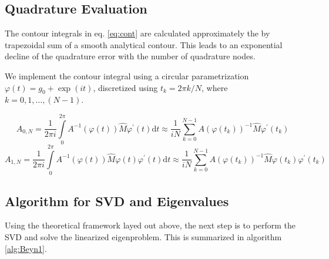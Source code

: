 \documentclass[final,leqno,onefignum,onetabnum]{siamltex1213}
\newcommand{\diff}{\mathrm{d}}
\begin{document}
\subsection{Quadrature Evaluation}
The contour integrals in eq. \ref{eq:cont} are calculated approximately the by trapezoidal sum of a smooth analytical contour. This leads to an exponential decline of the quadrature error with the number of quadrature nodes.

We implement the contour integral using a circular parametrization $\varphi(t) = g_0 + \exp(i t)$, discretized using $t_k = 2\pi k/N$, where $k=0,1,\ldots,(N-1)$. 

\begin{equation}\label{eq:A0int}
A_{0,N} = \frac{1}{2\pi i}\int\limits_{0}^{2\pi} A^{-1}(\varphi(t))\hat{M} \varphi^{\prime}(t)\diff t 
\approx \frac{1}{iN}\sum\limits_{k=0}^{N-1}A(\varphi(t_k))^{-1}\hat{M}\varphi^{\prime}(t_k)
\end{equation}
\begin{equation}\label{eq:A1int}
A_{1,N} = \frac{1}{2\pi i}\int\limits_{0}^{2\pi} A^{-1}(\varphi(t))\hat{M} \varphi(t) \varphi^{\prime}(t)\diff t
\approx \frac{1}{iN}\sum\limits_{k=0}^{N-1}A(\varphi(t_k))^{-1}\hat{M} \varphi(t_k) \varphi^{\prime}(t_k)
\end{equation}

\subsection{Algorithm for SVD and Eigenvalues}
Using the theoretical framework layed out above, the next step is to perform the SVD and solve the linearized eigenproblem. This is summarized in algorithm \ref{alg:Beyn1}. 
\end{document}
